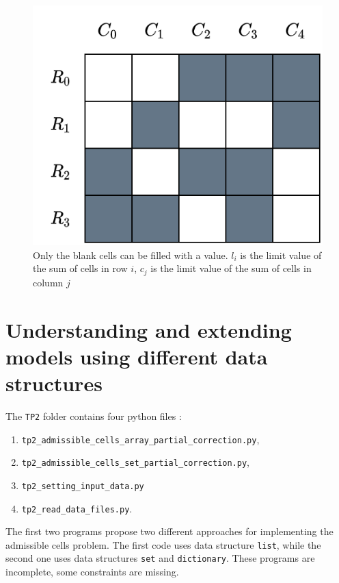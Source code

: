 \documentclass[a4paper, 12pt]{article}
\begin{document}
\begin{figure}[H]
  \begin{center}
    \begin{minipage}{0.5\textwidth}
      \centering
      \includegraphics[width=\textwidth]{./img/admissible_cells.png}
    \end{minipage}
    \hfill
    \begin{minipage}{0.48\textwidth}
      \centering
      \caption{Only the blank cells can be filled with a value. \(l_i\) is the limit value of the sum of cells in row \(i\), \(c_j\) is the limit value of the sum of cells in column \(j\)}\label{fig:admissible_cells}
    \end{minipage}
  \end{center}
\end{figure}


\section{Understanding and extending models using different data structures}
The \texttt{TP2} folder contains four python files : 
\begin{enumerate}
  \item \texttt{tp2\_admissible\_cells\_array\_partial\_correction.py}, 
  \item  \texttt{tp2\_admissible\_cells\_set\_partial\_correction.py}, 
  \item \texttt{tp2\_setting\_input\_data.py} 
  \item  \texttt{tp2\_read\_data\_files.py}. 
\end{enumerate}
The first two programs propose two different approaches for implementing the admissible cells problem. The first code uses data structure \texttt{list}, while the second one uses data structures \texttt{set} and  \texttt{dictionary}.  These programs are incomplete, some constraints are missing. 
\end{document}
